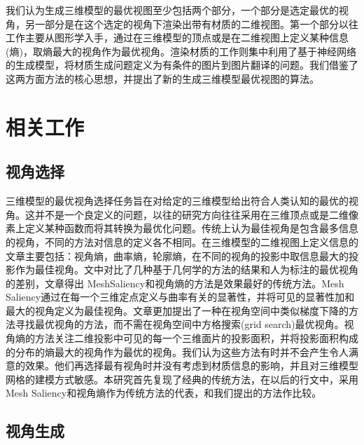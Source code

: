 \documentclass[UTF8,openany,AutoFakeBold,AutoFakeSlant,cs4size]{ctexbook}
\begin{document}
我们认为生成三维模型的最优视图至少包括两个部分，一个部分是选定最优的视角，另一部分是在这个选定的视角下渲染出带有材质的二维视图。第一个部分以往工作主要从图形学入手，通过在三维模型的顶点或是在二维视图上定义某种信息(熵)，取熵最大的视角作为最优视角。渲染材质的工作则集中利用了基于神经网络的生成模型，将材质生成问题定义为有条件的图片到图片翻译的问题。我们借鉴了这两方面方法的核心思想，并提出了新的生成三维模型最优视图的算法。

\section{相关工作}

\subsection{视角选择}

三维模型的最优视角选择任务旨在对给定的三维模型给出符合人类认知的最优的视角。这并不是一个良定义的问题，以往的研究方向往往采用在三维顶点或是二维像素上定义某种函数而将其转换为最优化问题。传统上认为最佳视角是包含最多信息的视角，不同的方法对信息的定义各不相同。在三维模型的二维视图上定义信息的文章主要包括：视角熵\cite{Vzquez2003AutomaticVS}，曲率熵\cite{Page2003ShapeAA}，轮廓熵\cite{Page2003ShapeAA}，在不同的视角的投影中取信息最大的投影作为最佳视角。\cite{Dutagaci2010ABF}文中对比了几种基于几何学的方法的结果和人为标注的最优视角的差别，文章得出 MeshSaliency\cite{Lee2005MeshS}和视角熵\cite{Vzquez2003AutomaticVS}的方法是效果最好的传统方法。Mesh Saliency\cite{Lee2005MeshS}通过在每一个三维定点定义与曲率有关的显著性，并将可见的显著性加和最大的视角定义为最佳视角。文章更加提出了一种在视角空间中类似梯度下降的方法寻找最优视角的方法，而不需在视角空间中方格搜索(grid search)最优视角。视角熵\cite{Vzquez2003AutomaticVS}的方法关注二维投影中可见的每一个三维面片的投影面积，并将投影面积构成的分布的熵最大的视角作为最优的视角。我们认为这些方法有时并不会产生令人满意的效果。他们再选择最有视角时并没有考虑到材质信息的影响，并且对三维模型网格的建模方式敏感。本研究首先复现了经典的传统方法，在以后的行文中，采用Mesh Saliency和视角熵作为传统方法的代表，和我们提出的方法作比较。

\subsection{视角生成}
\end{document}
